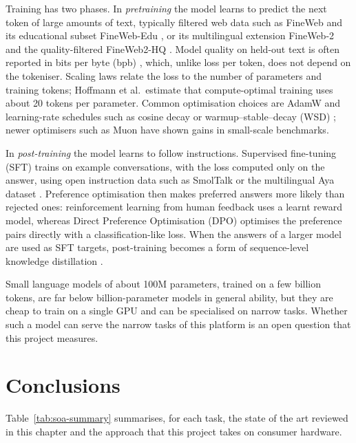 Training has two phases. In \textit{pretraining} the model learns to predict the next token of large amounts of text, typically filtered web data such as FineWeb and its educational subset FineWeb-Edu \cite{penedo2024fineweb}, or its multilingual extension FineWeb-2 \cite{penedo2025fineweb2} and the quality-filtered FineWeb2-HQ \cite{messmer2025fineweb2hq}. Model quality on held-out text is often reported in bits per byte (bpb) \cite{gao2020pile}, which, unlike loss per token, does not depend on the tokeniser. Scaling laws \cite{kaplan2020scaling, hoffmann2022chinchilla} relate the loss to the number of parameters and training tokens; Hoffmann et al.\ estimate that compute-optimal training uses about 20 tokens per parameter. Common optimisation choices are AdamW \cite{loshchilov2019adamw} and learning-rate schedules such as cosine decay or warmup--stable--decay (WSD) \cite{hu2024minicpm}; newer optimisers such as Muon \cite{jordan2024muon} have shown gains in small-scale benchmarks.

In \textit{post-training} the model learns to follow instructions. Supervised fine-tuning (SFT) trains on example conversations, with the loss computed only on the answer, using open instruction data such as SmolTalk \cite{allal2025smollm2} or the multilingual Aya dataset \cite{singh2024aya}. Preference optimisation then makes preferred answers more likely than rejected ones: reinforcement learning from human feedback \cite{ouyang2022instructgpt} uses a learnt reward model, whereas Direct Preference Optimisation (DPO) \cite{rafailov2023dpo} optimises the preference pairs directly with a classification-like loss. When the answers of a larger model are used as SFT targets, post-training becomes a form of sequence-level knowledge distillation \cite{kim2016seqkd}.

Small language models of about 100M parameters, trained on a few billion tokens, are far below billion-parameter models in general ability, but they are cheap to train on a single GPU and can be specialised on narrow tasks. Whether such a model can serve the narrow tasks of this platform is an open question that this project measures.

\section{Conclusions}

Table~\ref{tab:soa-summary} summarises, for each task, the state of the art reviewed in this chapter and the approach that this project takes on consumer hardware.

